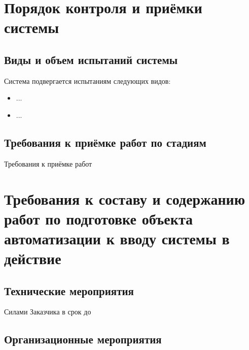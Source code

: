 \documentclass[a4paper, 12pt]{article}		%
\begin{document}

\newpage
\section{Порядок контроля и приёмки системы}

\subsection{Виды и объем испытаний системы}
Система подвергается испытаниям следующих видов:
\begin{itemize}
\item ...
\item ...
\end{itemize}

\subsection{Требования к приёмке работ по стадиям}

Требования к приёмке работ

\newpage
\section{Требования к составу и содержанию работ по подготовке объекта автоматизации к вводу системы в действие}


\subsection{Технические мероприятия}

Силами Заказчика в срок до

\subsection{Организационные мероприятия}
\end{document}
